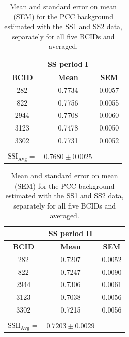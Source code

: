 \begin{table}[h!]
  \begin{center}
    \caption[Background values for the two super separation periods]{Mean and standard error on mean (SEM) for the PCC background estimated with the SS1 and SS2 data, separately for all five BCIDs and averaged.}
    \label{ss_per_bx}
    \begin{tabular}{|c | c | c | }
      \multicolumn{1}{c}{} & \multicolumn{1}{c}{\textbf{SS period I}} & \multicolumn{1}{c}{}  \\
      \hline
 \textbf{BCID}   & \textbf{Mean}   &  \textbf{SEM}\\
     \hline %
      282 & 0.7734 & 0.0057\\
      \hline
      822 & 0.7756 & 0.0055\\ 
      \hline
      2944 & 0.7708 & 0.0060\\ 
      \hline
      3123 & 0.7478 & 0.0050\\ 
      \hline
      3302 & 0.7731 & 0.0052\\ 
      \hline
      \multicolumn{1}{c}{} & \multicolumn{1}{c}{} & \multicolumn{1}{c}{}\\
      \multicolumn{1}{c}{$\text{SSI}_{\text{Avg}}=$} & \multicolumn{1}{l}{$0.7680 \pm 0.0025$} & \multicolumn{1}{c}{}\\
    \end{tabular}
    \hspace{0.5cm}
    \begin{tabular}{|c | c | c | }
      \multicolumn{1}{c}{} & \multicolumn{1}{c}{\textbf{SS period II}} & \multicolumn{1}{c}{ }  \\
      \hline
 \textbf{BCID}   & \textbf{Mean}   &  \textbf{SEM}\\
     \hline %
      282 & 0.7207 & 0.0052\\
      \hline
      822 & 0.7247 & 0.0090\\ 
      \hline
      2944 & 0.7306 & 0.0061\\ 
      \hline
      3123 & 0.7038 & 0.0056\\ 
      \hline
      3302 & 0.7215 & 0.0056\\ 
      \hline
      \multicolumn{1}{c}{} & \multicolumn{1}{c}{} & \multicolumn{1}{c}{}\\
      \multicolumn{1}{c}{$\text{SSII}_{\text{Avg}}=$} & \multicolumn{1}{l}{$ 0.7203 \pm 0.0029$} & \multicolumn{1}{c}{}
    \end{tabular}   
  \end{center}
\end{table}

